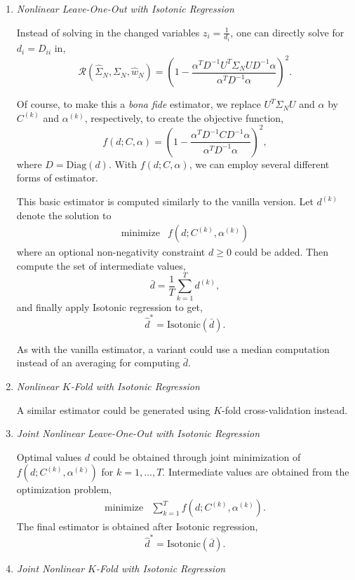 \documentclass{article}
\begin{document}
\begin{enumerate}
\item \emph{Nonlinear Leave-One-Out with Isotonic Regression}

Instead of solving in the changed variables $z_i = \frac{1}{d_i}$, one can
directly solve for $d_i = D_{ii}$ in,
$$
	\mathcal{R}(\hat{\Sigma}_N, \Sigma_N, \hat{w}_N)
		= \left(
				1 - \frac{\alpha^T D^{-1} U^T\Sigma_N U D^{-1} \alpha}
								 {\alpha^T D^{-1} \alpha}
			\right)^2.
$$

Of course, to make this a \emph{bona fide} estimator, we replace $U^T\Sigma_N U$
and $\alpha$ by $C^{(k)}$ and $\alpha^{(k)}$, respectively, to create the
objective function,
$$
	f(d; C, \alpha)
		 = \left( 
		 			1 - \frac{ \alpha^T D^{-1} C D^{-1} \alpha}{ \alpha^T D^{-1} \alpha }
			\right)^2,
$$
where $D = \mathrm{Diag}(d)$.  With $f(d; C, \alpha)$, we can employ several
different forms of estimator.

This basic estimator is computed similarly to the vanilla version.  Let
$d^{(k)}$ denote the solution to
$$
\begin{array}{ll}
	\mbox{minimize}   & f(d; C^{(k)}, \alpha^{(k)})
\end{array}
$$
where an optional non-negativity constraint $d \geq 0$ could be added.  Then
compute the set of intermediate values,
$$
	\bar{d} = \frac1T \sum_{k=1}^T d^{(k)},
$$
and finally apply Isotonic regression to get,
$$
	\hat{d}^* = \mathrm{Isotonic}(\bar{d}).
$$

As with the vanilla estimator, a variant could use a median computation instead
of an averaging for computing $\bar{d}$.

\item \emph{Nonlinear $K$-Fold with Isotonic Regression}

A similar estimator could be generated using $K$-fold cross-validation instead.

\item \emph{Joint Nonlinear Leave-One-Out with Isotonic Regression}

Optimal values $d$ could be obtained through joint minimization of $f(d;
C^{(k)}, \alpha^{(k)})$ for $k=1, \ldots, T$.  Intermediate values are obtained
from the optimization problem,
$$
\begin{array}{ll}
	\mbox{minimize}   & \sum_{k=1}^T f(d; C^{(k)}, \alpha^{(k)}).
\end{array}
$$
The final estimator is obtained after Isotonic regression,
$$
	\hat{d}^* = \mathrm{Isotonic}(\bar{d}).
$$

\item \emph{Joint Nonlinear $K$-Fold with Isotonic Regression}


\end{enumerate}
\end{document}

